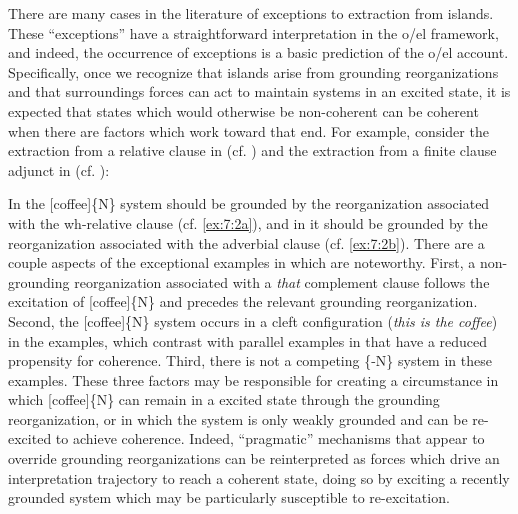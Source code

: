   There are many cases in the literature of exceptions to extraction from islands. These “exceptions” have a straightforward interpretation in the o/el framework, and indeed, the occurrence of exceptions is a basic prediction of the o/el account. Specifically, once we recognize that islands arise from grounding reorganizations and that surroundings forces can act to maintain systems in an excited state, it is expected that states which would otherwise be non-coherent can be coherent when there are factors which work toward that end. For example, consider the extraction from a relative clause in  (cf. \citep{Erteschik-ShirLappin1979}) and the extraction from a finite clause adjunct in  (cf. \citep{Truswell2011}):

\ea  \label{ex:7:1bis}
\z
\z

\ea \label{ex:7:2bis}
\z
\z

\ea \label{ex:7:3}
\z
\z

In  the [coffee]\{N\} system should be grounded by the reorganization associated with the wh-relative clause (cf. \ref{ex:7:2a}), and in  it should be grounded by the reorganization associated with the adverbial clause (cf. \ref{ex:7:2b}). There are a couple aspects of the exceptional examples in  which are noteworthy. First, a non-grounding reorganization associated with a \textit{that} complement clause follows the excitation of [coffee]\{N\} and precedes the relevant grounding reorganization. Second, the [coffee]\{N\} system occurs in a cleft configuration (\textit{this is the coffee}) in the  examples, which contrast with parallel examples in  that have a reduced propensity for coherence. Third, there is not a competing \{-N\} system in these examples. These three factors may be responsible for creating a circumstance in which [coffee]\{N\} can remain in a excited state through the grounding reorganization, or in which the system is only weakly grounded and can be re-excited to achieve coherence. Indeed, “pragmatic” mechanisms that appear to override grounding reorganizations can be reinterpreted as forces which drive an interpretation trajectory to reach a coherent state, doing so by exciting a recently grounded system which may be particularly susceptible to re-excitation.

